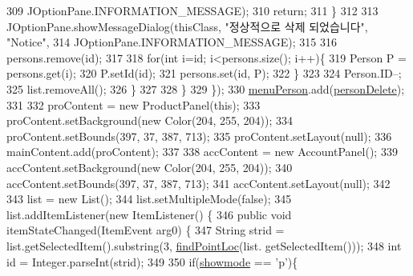 \begin{DoxyCode}
309                                 JOptionPane.INFORMATION\_MESSAGE);
310                         \textcolor{keywordflow}{return};
311                     \}
312                     
313                     JOptionPane.showMessageDialog(thisClass, \textcolor{stringliteral}{"정상적으로 삭제 되었습니다"}, \textcolor{stringliteral}{"Notice"}, 
314                             JOptionPane.INFORMATION\_MESSAGE);
315                     
316                     persons.remove(\textcolor{keywordtype}{id});
317                     
318                     \textcolor{keywordflow}{for}(\textcolor{keywordtype}{int} i=\textcolor{keywordtype}{id}; i<persons.size(); i++)\{
319                         Person P = persons.get(i);
320                         P.setId(\textcolor{keywordtype}{id});
321                         persons.set(\textcolor{keywordtype}{id}, P);
322                     \}
323                     
324                     Person.ID--;
325                     list.removeAll();
326                 \}
327                 
328             \}
329         \});
330         \hyperlink{classpkg_1_1_management_u_i_aac445016414136b78a968311480e8308}{menuPerson}.add(\hyperlink{classpkg_1_1_management_u_i_af5e74a22293246fcc049a6e21024e96f}{personDelete});
331         
332         proContent = \textcolor{keyword}{new} ProductPanel(\textcolor{keyword}{this});
333         proContent.setBackground(\textcolor{keyword}{new} Color(204, 255, 204));
334         proContent.setBounds(397, 37, 387, 713);
335         proContent.setLayout(null);
336         mainContent.add(proContent);
337         
338         accContent = \textcolor{keyword}{new} AccountPanel();
339         accContent.setBackground(\textcolor{keyword}{new} Color(204, 255, 204));
340         accContent.setBounds(397, 37, 387, 713);
341         accContent.setLayout(null);
342         
343         list = \textcolor{keyword}{new} List();
344         list.setMultipleMode(\textcolor{keyword}{false});
345         list.addItemListener(\textcolor{keyword}{new} ItemListener() \{
346             \textcolor{keyword}{public} \textcolor{keywordtype}{void} itemStateChanged(ItemEvent arg0) \{
347                 String strid = list.getSelectedItem().substring(3, \hyperlink{classpkg_1_1_management_u_i_a23fb9a0d7bae4106d1f604b6035de259}{findPointLoc}(list.
      getSelectedItem()));
348                 \textcolor{keywordtype}{int} \textcolor{keywordtype}{id} = Integer.parseInt(strid);
349                 
350                 \textcolor{keywordflow}{if}(\hyperlink{classpkg_1_1_management_u_i_a06db2befb99ab3b189caa39e736e2d0d}{showmode} == \textcolor{charliteral}{'p'})\{

\end{DoxyCode}
